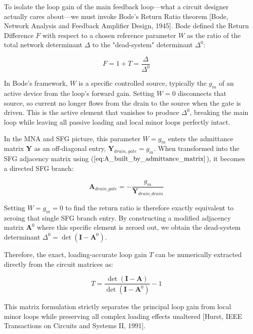 \documentclass[
]{article}
\begin{document}
To isolate the loop gain of the main feedback loop---what a circuit
designer actually cares about---we must invoke Bode's Return Ratio
theorem {[}Bode, Network Analysis and Feedback Amplifier Design,
1945{]}. Bode defined the Return Difference \(F\) with respect to a
chosen reference parameter \(W\) as the ratio of the total network
determinant \(\Delta\) to the "dead-system" determinant \(\Delta^0\):

\begin{equation}
    F = 1 + T = \frac{\Delta}{\Delta^0}
\end{equation}

In Bode's framework, \(W\) is a specific controlled source, typically
the \(g_m\) of an active device from the loop's forward gain. Setting
\(W = 0\) disconnects that source, so current no longer flows from the
drain to the source when the gate is driven. This is the active element
that vanishes to produce \(\Delta^0\), breaking the main loop while
leaving all passive loading and local minor loops perfectly intact.

In the MNA and SFG picture, this parameter \(W = g_m\) enters the
admittance matrix \(\mathbf{Y}\) as an off-diagonal entry,
\(\mathbf{Y}_{drain, gate} = g_m\). When transformed into the SFG
adjacency matrix using (\(\ref{eq:A_built_by_admittance_matrix}\)), it
becomes a directed SFG branch:

\begin{equation}
    \mathbf{A}_{drain\_gate} = -\frac{g_m}{\mathbf{Y}_{drain\_drain}}
\end{equation}

Setting \(W = g_m = 0\) to find the return ratio is therefore exactly
equivalent to zeroing that single SFG branch entry. By constructing a
modified adjacency matrix \(\mathbf{A}^0\) where this specific element
is zeroed out, we obtain the dead-system determinant
\(\Delta^0 = \det(\mathbf{I} - \mathbf{A}^0)\).

Therefore, the exact, loading-accurate loop gain \(T\) can be
numerically extracted directly from the circuit matrices as:

\begin{equation}
    T = \frac{\det(\mathbf{I} - \mathbf{A})}{\det(\mathbf{I} - \mathbf{A}^0)} - 1
\end{equation}

This matrix formulation strictly separates the principal loop gain from
local minor loops while preserving all complex loading effects unaltered
{[}Hurst, IEEE Transactions on Circuits and Systems II, 1991{]}.
\end{document}
